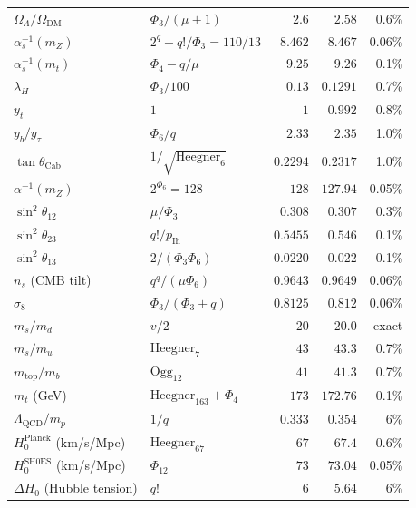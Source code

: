 \documentclass[11pt]{article}
\begin{document}
\begin{center}
\begin{tabular}{llrrr}
$\Omega_\Lambda/\Omega_{\mathrm{DM}}$ & $\Phi_3/(\mu+1)$        & $2.6$     & $2.58$    & 0.6\% \\
$\alpha_s^{-1}(m_Z)$       & $2^q + q!/\Phi_3 = 110/13$    & $8.462$   & $8.467$   & 0.06\% \\
$\alpha_s^{-1}(m_t)$       & $\Phi_4 - q/\mu$                & $9.25$    & $9.26$    & 0.1\% \\
$\lambda_H$                & $\Phi_3/100$                    & $0.13$    & $0.1291$  & 0.7\% \\
$y_t$                       & $1$                              & $1$       & $0.992$   & 0.8\% \\
$y_b/y_\tau$               & $\Phi_6/q$                       & $2.33$    & $2.35$    & 1.0\% \\
$\tan\theta_{\mathrm{Cab}}$ & $1/\sqrt{\mathrm{Heegner}_6}$  & $0.2294$  & $0.2317$  & 1.0\% \\
$\alpha^{-1}(m_Z)$         & $2^{\Phi_6} = 128$              & $128$     & $127.94$  & 0.05\% \\
$\sin^2\theta_{12}$        & $\mu/\Phi_3$                     & $0.308$   & $0.307$   & 0.3\% \\
$\sin^2\theta_{23}$        & $q!/p_{\mathrm{Ih}}$            & $0.5455$  & $0.546$   & 0.1\% \\
$\sin^2\theta_{13}$        & $2/(\Phi_3\Phi_6)$              & $0.0220$  & $0.022$   & 0.1\% \\
$n_s$ (CMB tilt)           & $q^q/(\mu\Phi_6)$               & $0.9643$  & $0.9649$  & 0.06\% \\
$\sigma_8$                  & $\Phi_3/(\Phi_3+q)$            & $0.8125$  & $0.812$   & 0.06\% \\
$m_s/m_d$                  & $v/2$                            & $20$      & $20.0$    & exact \\
$m_s/m_u$                  & $\mathrm{Heegner}_7$            & $43$      & $43.3$    & 0.7\% \\
$m_{\mathrm{top}}/m_b$     & $\mathrm{Ogg}_{12}$              & $41$      & $41.3$    & 0.7\% \\
$m_t$ (GeV)                & $\mathrm{Heegner}_{163} + \Phi_4$ & $173$     & $172.76$  & 0.1\% \\
$\Lambda_{\mathrm{QCD}}/m_p$ & $1/q$                            & $0.333$   & $0.354$   & 6\% \\
$H_0^{\mathrm{Planck}}$ (km/s/Mpc) & $\mathrm{Heegner}_{67}$  & $67$      & $67.4$    & 0.6\% \\
$H_0^{\mathrm{SH0ES}}$ (km/s/Mpc)  & $\Phi_{12}$              & $73$      & $73.04$   & 0.05\% \\
$\Delta H_0$ (Hubble tension)      & $q!$                     & $6$       & $5.64$    & 6\% \\
\bottomrule
\end{tabular}\end{center}
\end{document}
